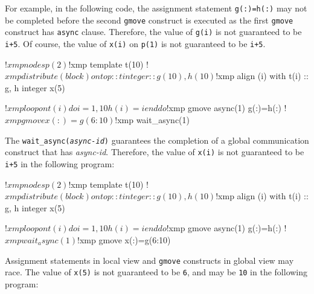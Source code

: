 For example, in the following code, the assignment statement
\texttt{g(:)=h(:)} may not be completed before the second
\texttt{gmove} construct is executed as the first \texttt{gmove}
construct has \texttt{async} clause.  Therefore, the value of
\texttt{g(i)} is not guaranteed to be \texttt{i+5}.  Of course, the
value of \texttt{x(i)} on \texttt{p(1)} is not guaranteed to be
\texttt{i+5}.
\begin{center}
\begin{XFexample}
!$xmp nodes p(2)
!$xmp template t(10)
!$xmp distribute (block) onto p :: t
      integer :: g(10), h(10)
!$xmp align (i) with t(i) :: g, h
      integer x(5)

!$xmp loop on t(i)
      do i=1,10
      h(i)=i
      end do

!$xmp gmove async(1)
      g(:)=h(:)
!$xmp gmove
      x(:)=g(6:10)
!$xmp wait_async(1)
\end{XFexample}
\end{center}

The \texttt{wait\_async(\textit{async-id})} guarantees the completion
of a global communication construct that has \textit{async-id}.
Therefore, the value of \texttt{x(i)} is not guaranteed to be
\texttt{i+5} in the following program:
\begin{center}
\begin{XFexample}
!$xmp nodes p(2)
!$xmp template t(10)
!$xmp distribute (block) onto p :: t
      integer :: g(10), h(10)
!$xmp align (i) with t(i) :: g, h
      integer x(5)

!$xmp loop on t(i)
      do i=1,10
      h(i)=i
      end do

!$xmp gmove async(1)
      g(:)=h(:)
!$xmp wait_async(1)
!$xmp gmove
      x(:)=g(6:10)
\end{XFexample}
\end{center}

Assignment statements in local view and \texttt{gmove} constructs in
global view may race.  The value of \texttt{x(5)} is not guaranteed to
be \texttt{6}, and may be \texttt{10} in the following program:
\begin{center}
\end{center}

